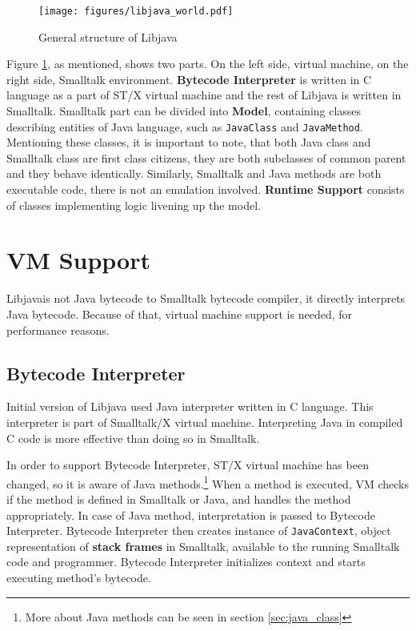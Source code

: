 \documentclass[11pt,twoside,a4paper]{book}
\newcommand{\libjava}{{Libjava}}
\begin{document}
\begin{figure}[ht]
	\begin{center}
		\texttt{[image: figures/libjava\_world.pdf]}
	\end{center}
	\caption{General structure of \libjava{}}
	\label{fig:libjava_world}
\end{figure}

Figure \ref{fig:libjava_world}, as mentioned, shows two parts. 
On the left side, virtual machine, on the right side, Smalltalk environment.
\textbf{Bytecode Interpreter} is written in C language as a part of ST/X virtual machine and the rest of \libjava{} is written in Smalltalk. 
Smalltalk part can be divided into \textbf{Model}, containing classes describing entities of Java language, such as \texttt{JavaClass} and \texttt{JavaMethod}. 
Mentioning these classes, it is important to note, that both Java class and Smalltalk class are first class citizens, they are both subclasses of common parent and they behave identically.
Similarly, Smalltalk and Java methods are both executable code, there is not an emulation involved.
\textbf{Runtime Support} consists of classes implementing logic livening up the model. 

\section{VM Support}

\libjava is not Java bytecode to Smalltalk bytecode compiler, it directly interprets Java bytecode.
Because of that, virtual machine support is needed, for performance reasons.

\subsection{Bytecode Interpreter}

Initial version of \libjava{} used Java interpreter written in C language. 
This interpreter is part of Smalltalk/X virtual machine. 
Interpreting Java in compiled C code is more effective than doing so in Smalltalk.

In order to support Bytecode Interpreter, ST/X virtual machine has been changed, so it is aware of Java methods.\footnote{More about Java methods can be seen in section \ref{sec:java_class}}
When a method is executed, VM checks if the method is defined in Smalltalk or Java, and handles the method appropriately. 
In case of Java method, interpretation is passed to Bytecode Interpreter. 
Bytecode Interpreter then creates instance of \texttt{JavaContext}, object representation of \textbf{stack frames} in Smalltalk, available to the running Smalltalk code and programmer. 
Bytecode Interpreter initializes context and starts executing method's bytecode. 
\end{document}
